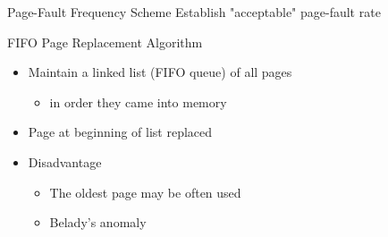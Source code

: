 \begin{frame}{Page-Fault Frequency Scheme}
  Establish "acceptable" page-fault rate
  \begin{center}
  \end{center}
\end{frame}

\begin{frame}{FIFO Page Replacement Algorithm}
  \begin{center}
  \end{center}
  \begin{itemize}
  \item Maintain a linked list (FIFO queue) of all pages
    \begin{itemize}
    \item in order they came into memory
    \end{itemize}
  \item Page at beginning of list replaced
  \item Disadvantage
    \begin{itemize}
    \item The oldest page may be often used
    \item Belady's anomaly
    \end{itemize}
  \end{itemize}
\end{frame}

